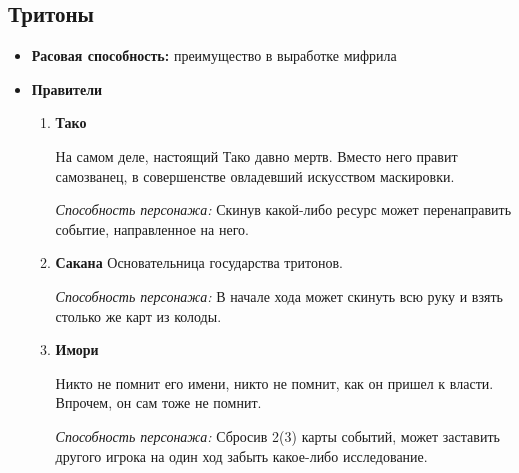 \documentclass[a4paper,12pt,landscape]{article}
\begin{document}
    \subsection{Тритоны}
    \begin{itemize}
      \item \textbf{Расовая способность:} преимущество в выработке мифрила
      \item \textbf{Правители}
        \begin{enumerate}
          \item \textbf{Тако} 
        
          На самом деле, настоящий Тако давно мертв. Вместо него правит самозванец, в совершенстве овладевший искусством маскировки.

          \textit{Способность персонажа:} Скинув какой-либо ресурс может перенаправить событие, направленное на него.
          
          \item \textbf{Сакана}
          Основательница государства тритонов.
          
          \textit{Способность персонажа:} В начале хода может скинуть всю руку и взять столько же карт из колоды.
          
          \item \textbf{Имори}
          
          Никто не помнит его имени, никто не помнит, как он пришел к власти. Впрочем, он сам тоже не помнит.
          
          \textit{Способность персонажа:} Сбросив 2(3) карты событий, может заставить другого игрока на один ход забыть какое-либо исследование.
          
        
      \end{enumerate}
    \end{itemize}
    
\end{document}
